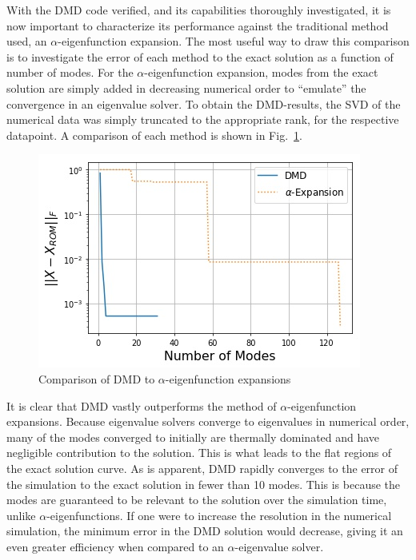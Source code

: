 \documentclass{style/nseJournal}
\newcommand{\LFI}[1]{\label{fi:#1}}
\newcommand{\FI}[1]{Fig.~\ref{fi:#1}}
\newcommand{\bfg}{\begin{figure}}
\newcommand{\efg}{\end{figure}}
\begin{document}
With the DMD code verified, and its capabilities thoroughly investigated, it is now important to characterize its performance against the traditional method used, an $\alpha$-eigenfunction expansion.  
The most useful way to draw this comparison is to investigate the error of each method to the exact solution as a function of number of modes.  
For the $\alpha$-eigenfunction expansion, modes from the exact solution are simply added in decreasing numerical order to ``emulate'' the convergence in an eigenvalue solver.  
To obtain the DMD-results, the SVD of the numerical data was simply truncated to the appropriate rank, for the respective datapoint.  
A comparison of each method is shown in \FI{comp}.  
\bfg[!htb] \centering
\includegraphics[scale=0.5]{figures/NSE19-11Fig07.jpg}
	\caption{Comparison of DMD to $\alpha$-eigenfunction expansions}
	\LFI{comp}
\efg

It is clear that DMD vastly outperforms the method of $\alpha$-eigenfunction expansions.  
Because eigenvalue solvers converge to eigenvalues in numerical order, many of the modes converged to initially are thermally dominated and have negligible contribution to the solution.  
This is what leads to the flat regions of the exact solution curve.  
As is apparent, DMD rapidly converges to the error of the simulation to the exact solution in fewer than 10 modes.  
This is because the modes are guaranteed to be relevant to the solution over the simulation time, unlike $\alpha$-eigenfunctions.  
If one were to increase the resolution in the numerical simulation, the minimum error in the DMD solution would decrease, giving it an even greater efficiency when compared to an $\alpha$-eigenvalue solver.  
\end{document}

